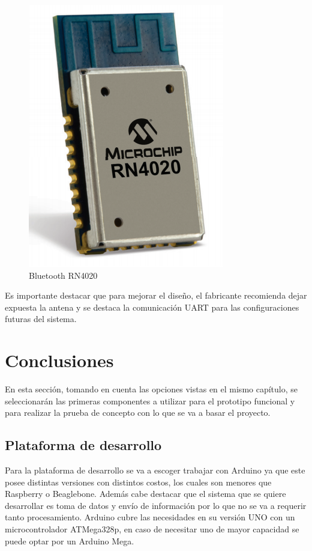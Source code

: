 \begin{figure}[H]
	\centering
	\includegraphics[scale=0.5]{figuras/com/rn4020.png}
	\caption{Bluetooth RN4020}
	\label{bt}
\end{figure}

Es importante destacar que para mejorar el diseño, el fabricante recomienda dejar expuesta la antena y se destaca la comunicación UART para las configuraciones futuras del sistema.

\newpage

\section{Conclusiones}
En esta sección, tomando en cuenta las opciones vistas en el mismo capítulo, se seleccionarán las primeras componentes a utilizar para el prototipo funcional y para realizar la prueba de concepto con lo que se va a basar el proyecto.
\subsection{Plataforma de desarrollo}
Para la plataforma de desarrollo se va a escoger trabajar con Arduino ya que este posee distintas versiones con distintos costos, los cuales son menores que Raspberry o Beaglebone. Además cabe destacar que el sistema que se quiere desarrollar es toma de datos y envío de información por lo que no se va a requerir tanto procesamiento. Arduino cubre las necesidades en su versión UNO con un microcontrolador ATMega328p, en caso de necesitar uno de mayor capacidad se puede optar por un Arduino Mega.

